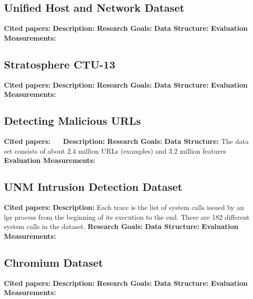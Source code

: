 \subsection{Unified Host and Network Dataset}
\textbf{Cited papers:} \newline
\textbf{Description:} \newline
\textbf{Research Goals:}  \newline
\textbf{Data Structure:} \newline
\textbf{Evaluation Measurements:} \newline


\subsection{Stratosphere CTU-13}
\textbf{Cited papers:} \newline
\textbf{Description:} \newline
\textbf{Research Goals:}  \newline
\textbf{Data Structure:} \newline
\textbf{Evaluation Measurements:} \newline


\subsection{Detecting Malicious URLs}
\textbf{Cited papers:}~\cite{ma2010exploiting}~\cite{ma2009identifying}~\cite{ma2009beyond} \newline
\textbf{Description:} \newline
\textbf{Research Goals:}  \newline
\textbf{Data Structure:} The data set consists of about 2.4 million URLs (examples) and 3.2 million features \newline
\textbf{Evaluation Measurements:} \newline


\subsection{UNM Intrusion Detection Dataset}
\textbf{Cited papers:} \newline
\textbf{Description:} Each trace is the list of system calls issued by an lpr process from the beginning of its execution to the end. There are 182 different system calls in the dataset.\newline
\textbf{Research Goals:}  \newline
\textbf{Data Structure:} \newline
\textbf{Evaluation Measurements:} \newline


\subsection{Chromium Dataset}
\textbf{Cited papers:} \newline
\textbf{Description:} \newline
\textbf{Research Goals:}  \newline
\textbf{Data Structure:} \newline
\textbf{Evaluation Measurements:} \newline

